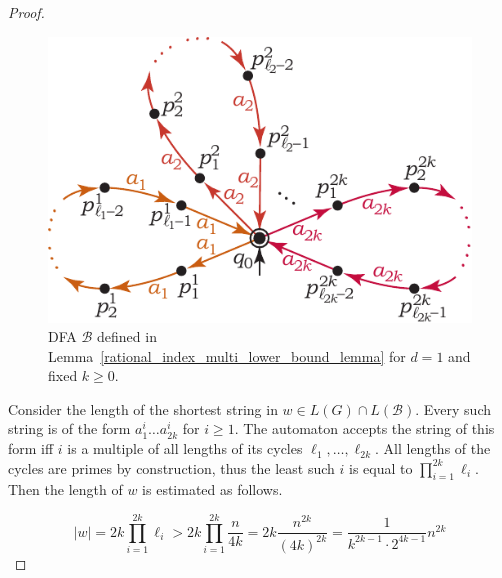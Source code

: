 \documentclass[runningheads]{llncs}
\begin{document}
\begin{proof}
\begin{figure}[t]
	\centering
	\includegraphics[scale=0.9]{rational_index_multi_A1}
	\caption{DFA $\mathcal{B}$ defined in Lemma~\ref{rational_index_multi_lower_bound_lemma} for $d=1$
		and fixed $k \geqslant 0$.}
	\label{mcfg_dim1_lower_aut}
\end{figure}

Consider the length of the shortest string in $w \in L(G) \cap L(\mathcal{B})$.
Every such string is of the form $a^i_1 \ldots a^i_{2k}$ for $i \geqslant 1$.
The automaton accepts the string of this form iff $i$ is a multiple of all lengths
of its cycles $\ell_1, \ldots, \ell_{2k}$. All lengths of the cycles are primes by 
construction, thus the least such $i$ is equal to $\prod\limits_{i=1}^{2k}\ell_i$.
Then the length of $w$ is estimated as follows.

\begin{equation*}
	|w|
		=
	2k\prod\limits_{i=1}^{2k} \ell_i
		> 
	2k \prod\limits_{i=1}^{2k} \frac{n}{4k}
		=
	2k \frac{n^{2k}}{(4k)^{2k}}
		=
	\frac{1}{k^{2k-1}\cdot 2^{4k-1}}
	n^{2k}
\end{equation*}


\end{proof}
\end{document}
